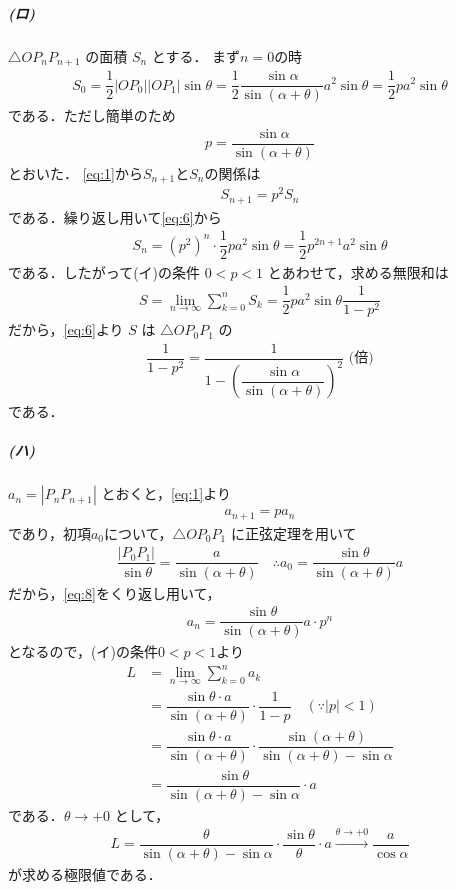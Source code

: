 \documentclass[../../main.tex]{subfiles}
\begin{document}
\subparagraph{(ロ)}

$\triangle O P_n P_{n+1}$ の面積 $S_n$ とする．
まず$n=0$の時
\begin{align}
  S_0
  = \dfrac{1}{2} |O P_0| |O P_1| \sin\theta
  = \dfrac{1}{2} \dfrac{\sin\alpha}{\sin(\alpha+\theta)}a^2\sin \theta
  = \dfrac{1}{2}pa^2\sin \theta \label{eq:6}
\end{align}
である．ただし簡単のため
\begin{align}
  p = \dfrac{\sin \alpha}{\sin(\alpha+\theta)} \label{eq:7}
\end{align}
とおいた．
\cref{eq:1}から$S_{n+1}$と$S_{n}$の関係は
\begin{align}
  S_{n+1} = p^2 S_n
\end{align}
である．繰り返し用いて\cref{eq:6}から
\begin{align}
  S_n = (p^2)^{n} \cdot \dfrac{1}{2} p a^2 \sin\theta = \dfrac{1}{2} p^{2n+1} a^2\sin\theta
\end{align}
である．したがって(イ)の条件 $0 < p < 1$ とあわせて，求める無限和は
\begin{align}
  S = \lim_{n \to \infty} \sum_{k=0}^n S_k = \dfrac{1}{2} p a^2\sin\theta \dfrac{1}{1-p^2}
\end{align}
だから，\cref{eq:6}より $S$ は $\triangle O P_0 P_1$ の
\begin{align}
  \dfrac{1}{1-p^2} = \dfrac{1}{1 - \left( \dfrac{\sin \alpha}{\sin(\alpha+\theta)} \right)^2} \text{ (倍)}
\end{align}
である．

\subparagraph{(ハ)}

$a_n = |P_n P_{n+1}|$ とおくと，\cref{eq:1}より
\begin{align}
  a_{n+1} = p a_n \label{eq:8}
\end{align}
であり，初項$a_0$について，$\triangle O P_0 P_1$ に正弦定理を用いて
\begin{align}
  \dfrac{|P_0 P_1|}{\sin \theta}
  = \dfrac{a}{\sin(\alpha+\theta)}
  \quad \therefore
  a_0
  = \dfrac{\sin \theta}{\sin(\alpha+\theta)} a
\end{align}
だから，\cref{eq:8}をくり返し用いて，
\begin{align}
  a_n = \dfrac{\sin \theta}{\sin(\alpha+\theta)} a \cdot p^{n}
\end{align}
となるので，(イ)の条件$0<p<1$より
\begin{align}
  L
  &= \lim_{n \to \infty} \sum_{k=0}^n a_k \\
  &= \dfrac{\sin \theta \cdot a}{\sin(\alpha+\theta)} \cdot \dfrac{1}{1-p} \quad (\because |p| < 1) \\
  &= \dfrac{\sin \theta \cdot a}{\sin(\alpha+\theta)} \cdot \dfrac{\sin(\alpha+\theta)}{\sin(\alpha+\theta) - \sin \alpha} \\
  &= \dfrac{\sin \theta}{\sin(\alpha+\theta) - \sin \alpha} \cdot a
\end{align}
である．$\theta \to +0$ として，
\begin{align}
  L
  = \dfrac{\theta}{\sin(\alpha+\theta) - \sin \alpha} \cdot \dfrac{\sin \theta}{\theta} \cdot a \xrightarrow{\theta \to +0} \dfrac{a}{\cos \alpha}
\end{align}
が求める極限値である．

\newpage
\end{document}
